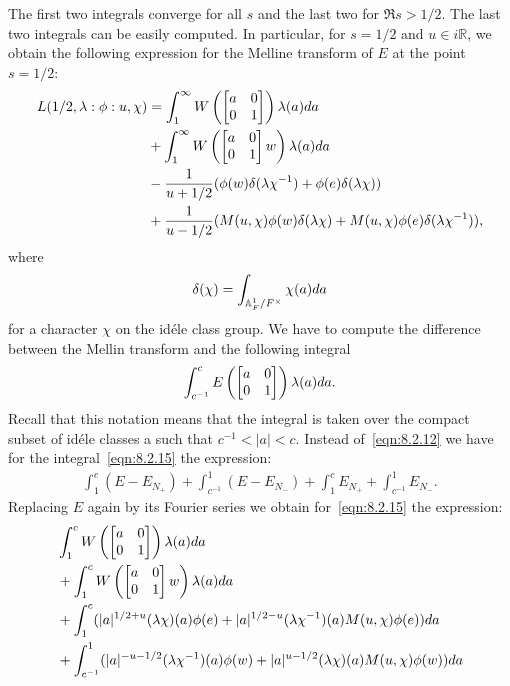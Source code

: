 The first two integrals converge for all $s$ and the last two for $\Re s > 1/2$.
The last two integrals can be easily computed.
In particular, for $s = 1/2$ and $u \in i\mathbb{R}$, 
we obtain the following expression for the Melline transform of $E$ at the point $s = 1/2$:
\begin{equation}
\begin{aligned}
\label{eqn:8.2.14}
    L(1/2, \lambda: \phi:u, \chi) &= \int_{1}^{\infty} W\left(\begin{bmatrix} a & 0 \\ 0 & 1 \end{bmatrix}\right) \lambda(a) da \\
    &+ \int_{1}^{\infty} W\left(\begin{bmatrix} a & 0 \\ 0 & 1 \end{bmatrix}w\right) \lambda(a) da \\
    &- \frac{1}{u + 1/2} (\phi(w)\delta(\lambda\chi^{-1}) + \phi(e) \delta(\lambda \chi)) \\
    &+ \frac{1}{u - 1/2} (M(u, \chi)\phi(w) \delta(\lambda\chi) + M(u, \chi)\phi(e) \delta(\lambda\chi^{-1})),
\end{aligned}
\end{equation}
where 
\begin{align*}
    \delta(\chi) = \int_{\mathbb{A}_F^{1} / F^\times} \chi(a) da
\end{align*}
for a character $\chi$ on the id\'ele class group.
We have to compute the difference between the Mellin transform and the following integral
\begin{align}
\label{eqn:8.2.15}
    \int_{c^{-1}}^{c} E\left(\begin{bmatrix} a & 0 \\ 0 & 1 \end{bmatrix}\right) \lambda(a) da.
\end{align}
Recall that this notation means that the integral is taken over the compact subset of id\'ele classes a such that $c^{-1} < |a|< c$.
Instead of~\eqref{eqn:8.2.12} we have for the integral~\eqref{eqn:8.2.15} the expression:
\begin{align}
    \int_{1}^{c} (E - E_{N_+}) + \int_{c^{-1}}^{1} (E - E_{N_-}) + \int_{1}^{c} E_{N_+} + \int_{c^{-1}}^{1} E_{N_-}.
\end{align}
Replacing $E$ again by its Fourier series we obtain for~\eqref{eqn:8.2.15} the expression:
\begin{equation}
\begin{aligned}
    &\int_{1}^{c} W\left(\begin{bmatrix} a & 0 \\ 0 & 1 \end{bmatrix}\right)\lambda(a) da \\
    &+ \int_{1}^{c} W\left(\begin{bmatrix} a & 0 \\ 0 & 1 \end{bmatrix}w\right)\lambda(a)da \\
    &+ \int_{1}^{c} (|a|^{1/2 + u}(\lambda\chi)(a)\phi(e) + |a|^{1/2 - u}(\lambda \chi^{-1})(a) M(u, \chi)\phi(e)) da \\
    &+ \int_{c^{-1}}^{1} (|a|^{-u-1/2}(\lambda\chi^{-1})(a) \phi(w) + |a|^{u-1/2} (\lambda\chi)(a) M(u, \chi) \phi(w)) da
\end{aligned}
\end{equation}
